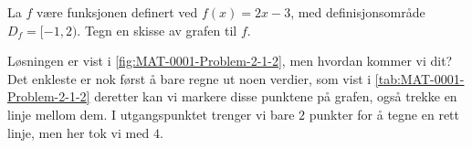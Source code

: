 \documentclass[a4paper,11pt]{article}
\begin{document}

\frontpageUiT



\UNIsection[2]


\begin{problem}[2]
    La $f$ være funksjonen definert ved $f(x) = 2x - 3$, med definisjonsområde
    $D_f = [-1, 2)$. Tegn en skisse av grafen til $f$.
\end{problem}

\begin{solution}
    Løsningen er vist i \cref{fig:MAT-0001-Problem-2-1-2}, men hvordan kommer vi dit? Det enkleste er nok først å bare regne ut noen verdier, som vist i
    \cref{tab:MAT-0001-Problem-2-1-2} deretter kan vi markere disse punktene på grafen, også trekke en linje mellom dem. I utgangspunktet trenger vi bare $2$ punkter for å tegne en rett linje, men her tok vi med $4$.
\end{solution}
\end{document}
